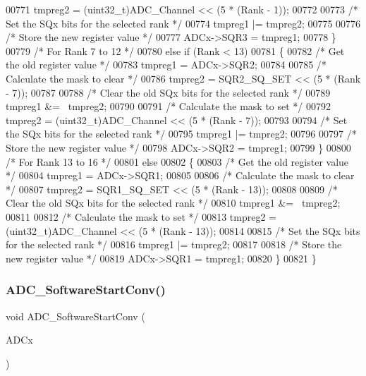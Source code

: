 \begin{DoxyCode}
00771     tmpreg2 = (uint32\_t)ADC\_Channel << (5 * (Rank - 1));
00772     
00773     \textcolor{comment}{/* Set the SQx bits for the selected rank */}
00774     tmpreg1 |= tmpreg2;
00775     
00776     \textcolor{comment}{/* Store the new register value */}
00777     ADCx->SQR3 = tmpreg1;
00778   \}
00779   \textcolor{comment}{/* For Rank 7 to 12 */}
00780   \textcolor{keywordflow}{else} \textcolor{keywordflow}{if} (Rank < 13)
00781   \{
00782     \textcolor{comment}{/* Get the old register value */}
00783     tmpreg1 = ADCx->SQR2;
00784     
00785     \textcolor{comment}{/* Calculate the mask to clear */}
00786     tmpreg2 = SQR2_SQ_SET << (5 * (Rank - 7));
00787     
00788     \textcolor{comment}{/* Clear the old SQx bits for the selected rank */}
00789     tmpreg1 &= ~tmpreg2;
00790     
00791     \textcolor{comment}{/* Calculate the mask to set */}
00792     tmpreg2 = (uint32\_t)ADC\_Channel << (5 * (Rank - 7));
00793     
00794     \textcolor{comment}{/* Set the SQx bits for the selected rank */}
00795     tmpreg1 |= tmpreg2;
00796     
00797     \textcolor{comment}{/* Store the new register value */}
00798     ADCx->SQR2 = tmpreg1;
00799   \}
00800   \textcolor{comment}{/* For Rank 13 to 16 */}
00801   \textcolor{keywordflow}{else}
00802   \{
00803     \textcolor{comment}{/* Get the old register value */}
00804     tmpreg1 = ADCx->SQR1;
00805     
00806     \textcolor{comment}{/* Calculate the mask to clear */}
00807     tmpreg2 = SQR1_SQ_SET << (5 * (Rank - 13));
00808     
00809     \textcolor{comment}{/* Clear the old SQx bits for the selected rank */}
00810     tmpreg1 &= ~tmpreg2;
00811     
00812     \textcolor{comment}{/* Calculate the mask to set */}
00813     tmpreg2 = (uint32\_t)ADC\_Channel << (5 * (Rank - 13));
00814     
00815     \textcolor{comment}{/* Set the SQx bits for the selected rank */}
00816     tmpreg1 |= tmpreg2;
00817     
00818     \textcolor{comment}{/* Store the new register value */}
00819     ADCx->SQR1 = tmpreg1;
00820   \}
00821 \}
\end{DoxyCode}
\mbox{\label{group__ADC__Group4_gac1cd466e725595812c1bbfdad2459ff1}} 
\subsubsection{A\+D\+C\+\_\+\+Software\+Start\+Conv()}
{\footnotesize\ttfamily void A\+D\+C\+\_\+\+Software\+Start\+Conv (\begin{DoxyParamCaption}\item[{\textbf{ A\+D\+C\+\_\+\+Type\+Def} $\ast$}]{A\+D\+Cx }\end{DoxyParamCaption})}



